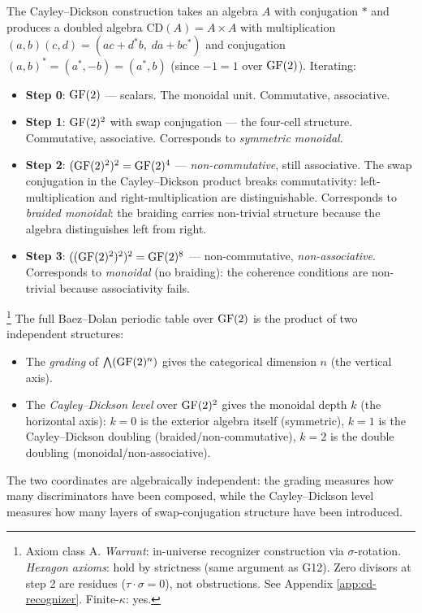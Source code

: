 \begin{definition}
\label{def:cayley-dickson}
The Cayley--Dickson construction takes an algebra $A$
with conjugation $*$ and produces a doubled algebra
$\mathrm{CD}(A) = A \times A$ with multiplication
$(a, b)(c, d) = (ac + d^* b,\; da + bc^*)$ and
conjugation $(a, b)^* = (a^*, -b) = (a^*, b)$ (since
$-1 = 1$ over $\operatorname{GF}(2)$). Iterating:
\begin{itemize}[nosep]
  \item \textbf{Step 0}: $\operatorname{GF}(2)$ --- scalars. The
    monoidal unit. Commutative, associative.
  \item \textbf{Step 1}: $\operatorname{GF}(2)^2$ with swap conjugation
    --- the four-cell structure. Commutative, associative.
    Corresponds to \emph{symmetric monoidal}.
  \item \textbf{Step 2}: $(\operatorname{GF}(2)^2)^2 = \operatorname{GF}(2)^4$ ---
    \emph{non-commutative}, still associative. The swap
    conjugation in the Cayley--Dickson product breaks
    commutativity: left-multiplication and
    right-multiplication are distinguishable. Corresponds
    to \emph{braided monoidal}: the braiding carries
    non-trivial structure because the algebra distinguishes
    left from right.
  \item \textbf{Step 3}:
    $((\operatorname{GF}(2)^2)^2)^2 = \operatorname{GF}(2)^8$ ---
    non-commutative, \emph{non-associative}. Corresponds
    to \emph{monoidal} (no braiding): the coherence
    conditions are non-trivial because associativity fails.
\end{itemize}
\end{definition}

\begin{theorem}\footnote{Axiom class \textsf{A}. \emph{Warrant}: in-universe recognizer construction via $\sigma$-rotation. \emph{Hexagon axioms}: hold by strictness (same argument as G12). Zero divisors at step 2 are residues ($\tau \cdot \sigma = 0$), not obstructions. See Appendix \ref{app:cd-recognizer}. Finite-$\kappa$: yes.}
\label{prop:periodic-2d}
The full Baez--Dolan periodic table over $\operatorname{GF}(2)$ is
the product of two independent structures:
\begin{itemize}[nosep]
  \item The \emph{grading} of $\bigwedge(\operatorname{GF}(2)^n)$ gives
    the categorical dimension $n$ (the vertical axis).
  \item The \emph{Cayley--Dickson level} over $\operatorname{GF}(2)^2$
    gives the monoidal depth $k$ (the horizontal axis):
    $k = 0$ is the exterior algebra itself (symmetric),
    $k = 1$ is the Cayley--Dickson doubling
    (braided/non-commutative), $k = 2$ is the double
    doubling (monoidal/non-associative).
\end{itemize}
The two coordinates are algebraically independent: the
grading measures how many discriminators have been
composed, while the Cayley--Dickson level measures how
many layers of swap-conjugation structure have been
introduced.
\end{theorem}


